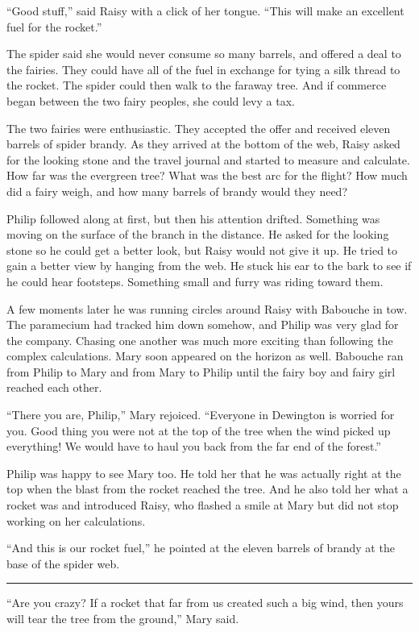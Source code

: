 \documentclass[10pt]{memoir}
\renewcommand{\pfbreakdisplay}{\bigskip \ding{166} \bigskip}
\newcommand{\secbreak}{\fancybreak{\pfbreakdisplay}}
\begin{document}
``Good stuff,'' said Raisy with a click of her tongue. ``This will make an
excellent fuel for the rocket.''

The spider said she would never consume so many barrels, and offered a deal to
the fairies. They could have all of the fuel in exchange for tying a silk thread
to the rocket. The spider could then walk to the faraway tree. And if commerce
began between the two fairy peoples, she could levy a tax.

The two fairies were enthusiastic. They accepted the offer and received eleven
barrels of spider brandy. As they arrived at the bottom of the web, Raisy asked
for the looking stone and the travel journal and started to measure and
calculate. How far was the evergreen tree? What was the best arc for the
flight? How much did a fairy weigh, and how many barrels of brandy would they
need?

Philip followed along at first, but then his attention drifted. Something was
moving on the surface of the branch in the distance. He asked for the looking
stone so he could get a better look, but Raisy would not give it up. He tried
to gain a better view by hanging from the web. He stuck his ear to the bark to
see if he could hear footsteps. Something small and furry was riding toward
them.

A few moments later he was running circles around Raisy with Babouche in tow.
The paramecium had tracked him down somehow, and Philip was very glad for the
company. Chasing one another was much more exciting than following the complex
calculations. Mary soon appeared on the horizon as well. Babouche ran from
Philip to Mary and from Mary to Philip until the fairy boy and fairy girl
reached each other.

``There you are, Philip,'' Mary rejoiced. ``Everyone in Dewington is worried
for you. Good thing you were not at the top of the tree when the wind picked up
everything! We would have to haul you back from the far end of the forest.''

Philip was happy to see Mary too. He told her that he was actually right at the
top when the blast from the rocket reached the tree. And he also told her what
a rocket was and introduced Raisy, who flashed a smile at Mary but did not
stop working on her calculations.

``And this is our rocket fuel,'' he pointed at the eleven barrels of brandy at
the base of the spider web.

\secbreak

``Are you crazy? If a rocket that far from us created such a big wind, then
yours will tear the tree from the ground,'' Mary said.
\end{document}
